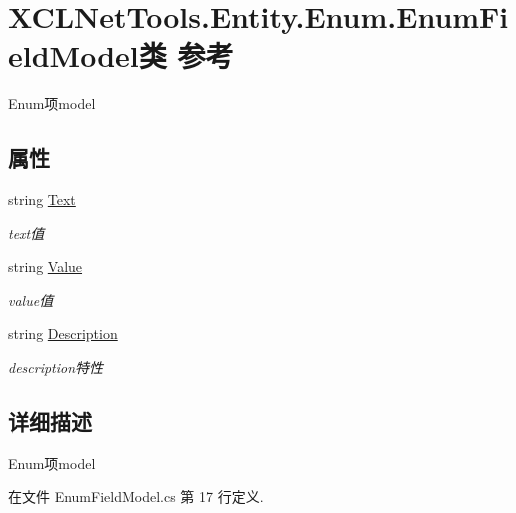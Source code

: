 \hypertarget{class_x_c_l_net_tools_1_1_entity_1_1_enum_1_1_enum_field_model}{}\section{X\+C\+L\+Net\+Tools.\+Entity.\+Enum.\+Enum\+Field\+Model类 参考}
\label{class_x_c_l_net_tools_1_1_entity_1_1_enum_1_1_enum_field_model}


Enum项model  


\subsection*{属性}
\begin{DoxyCompactItemize}
\item 
string \hyperlink{class_x_c_l_net_tools_1_1_entity_1_1_enum_1_1_enum_field_model_afba0a6a9289087c382b5d8050ff4dcd0}{Text}
\begin{DoxyCompactList}\small\item\em text值 \end{DoxyCompactList}\item 
string \hyperlink{class_x_c_l_net_tools_1_1_entity_1_1_enum_1_1_enum_field_model_aa2c519a0507eff410068ee108e7ed845}{Value}
\begin{DoxyCompactList}\small\item\em value值 \end{DoxyCompactList}\item 
string \hyperlink{class_x_c_l_net_tools_1_1_entity_1_1_enum_1_1_enum_field_model_aac9ea6b895da17a78a261f2721a6da08}{Description}
\begin{DoxyCompactList}\small\item\em description特性 \end{DoxyCompactList}\end{DoxyCompactItemize}


\subsection{详细描述}
Enum项model 



在文件 Enum\+Field\+Model.\+cs 第 17 行定义.



